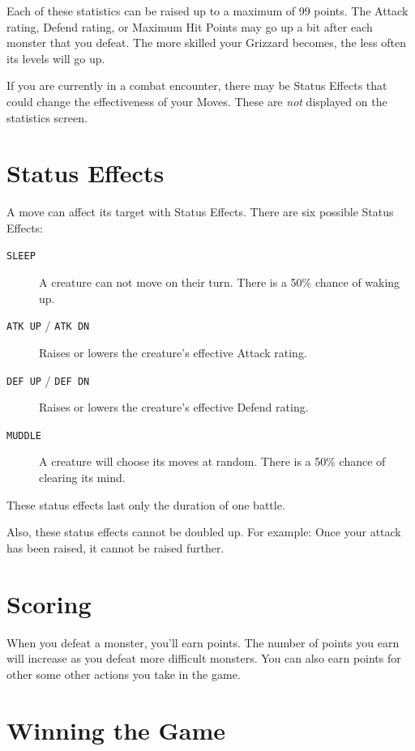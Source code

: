 \documentclass[10pt,twocolumn,openany,article]{memoir}
\begin{document}
Each of  these statistics can  be raised up to  a maximum of  99 points.
The Attack  rating, Defend  rating, or  Maximum Hit  Points may  go up
a bit after each monster that you defeat. The more skilled your Grizzard
becomes, the less often its levels will go up.

If you are currently in a  combat encounter, there may be Status Effects
that could change the effectiveness  of your Moves. These are \emph{not}
displayed on the statistics screen.

\section{Status Effects}\label{sec:StatusEffects}

A move can affect its target with Status Effects. There are six possible
Status Effects:

\begin{description}
\item[\texttt{SLEEP}] A  creature can not  move on their turn.  There is
  a 50\% chance of waking up.
\item[\texttt{ATK UP} / \texttt{ATK DN}] Raises or lowers the creature's
  effective Attack rating.
\item[\texttt{DEF UP} / \texttt{DEF DN}] Raises or lowers the creature's
  effective Defend rating.
\item[\texttt{MUDDLE}]  A  creature will  choose  its  moves at  random.
  There is a 50\% chance of clearing its mind.
\end{description}

These status effects last only the duration of one battle.

Also, these status effects cannot be  doubled up. For example: Once your
attack has been raised, it cannot be raised further.

\section{Scoring}

When you  defeat a monster, you'll  earn points. The number  of points
you earn  will increase as you  defeat more difficult monsters.  You can
also earn points for other some other actions you take in the game.

\section{Winning the Game}
\end{document}
